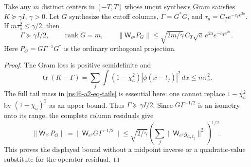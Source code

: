 \begin{proposition}
\label{ns46-a2-prop-transfer}
Take any $m$ distinct centers in $[-T,T]$ whose uncut synthesis
Gram satisfies $K\succeq\gamma I$, $\gamma>0$.
Let $G$ synthesize the cutoff columns, $\Gamma=G^*G$, and
$\tau_a=C_Te^{-c_Te^{2a}}$. If
$m\tau_a^2\le\gamma/2$, then
\begin{equation}\label{ns46-a2-eq-transfer}
 \Gamma\succeq\gamma I/2,\qquad
 \operatorname{rank}G=m,\qquad
 \|\mathsf W_{e^a}P_G\|
 \le \sqrt{2m/\gamma}\,
         C_T\sqrt a\,e^{2a}e^{-c_Te^{2a}}.
\end{equation}
Here $P_G=G\Gamma^{-1}G^*$ is the ordinary orthogonal projection.
\end{proposition}
\begin{proof}
The Gram loss is positive semidefinite and
\[
 \operatorname{tr}(K-\Gamma)
 =\sum_j\int(1-\chi_a^2)|\phi(x-t_j)|^2\,dx
 \le m\tau_a^2.
\]
The full tail mass in \eqref{ns46-a2-eq-tails} is essential here:
one cannot replace $1-\chi_a^2$ by $(1-\chi_a)^2$ as an upper bound.
Thus $\Gamma\succeq\gamma I/2$. Since $G\Gamma^{-1/2}$ is an
isometry onto its range, the complete column residuals give
\[
 \|\mathsf W_{e^a}P_G\|
 =\|\mathsf W_{e^a}G\Gamma^{-1/2}\|
 \le\sqrt{2/\gamma}
       \left(\sum_j\|\mathsf W_{e^a}g_{a,t_j}\|^2\right)^{1/2}.
\]
This proves the displayed bound without a midpoint inverse or a
quadratic-value substitute for the operator residual.
\end{proof}

